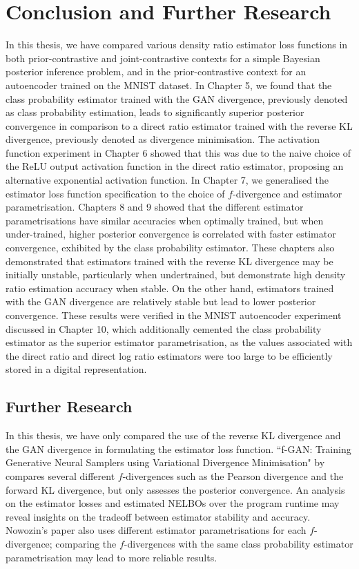\documentclass[honours,12pt]{unswthesis}
\numberwithin{equation}{section}
\theoremstyle{definition}
\begin{document}
\chapter{Conclusion and Further Research}
In this thesis, we have compared various density ratio estimator loss functions in both prior-contrastive and joint-contrastive contexts for a simple Bayesian posterior inference problem, and in the prior-contrastive context for an autoencoder trained on the MNIST dataset. In Chapter 5, we found that the class probability estimator trained with the GAN divergence, previously denoted as class probability estimation, leads to significantly superior posterior convergence in comparison to a direct ratio estimator trained with the reverse KL divergence, previously denoted as divergence minimisation. The activation function experiment in Chapter 6 showed that this was due to the naive choice of the ReLU output activation function in the direct ratio estimator, proposing an alternative exponential activation function. In Chapter 7, we generalised the estimator loss function specification to the choice of $f$-divergence and estimator parametrisation. Chapters 8 and 9 showed that the different estimator parametrisations have similar accuracies when optimally trained, but when under-trained, higher posterior convergence is correlated with faster estimator convergence, exhibited by the class probability estimator. These chapters also demonstrated that estimators trained with the reverse KL divergence may be initially unstable, particularly when undertrained, but demonstrate high density ratio estimation accuracy when stable. On the other hand, estimators trained with the GAN divergence are relatively stable but lead to lower posterior convergence. These results were verified in the MNIST autoencoder experiment discussed in Chapter 10, which additionally cemented the class probability estimator as the superior estimator parametrisation, as the values associated with the direct ratio and direct log ratio estimators were too large to be efficiently stored in a digital representation.
\section{Further Research}
In this thesis, we have only compared the use of the reverse KL divergence and the GAN divergence in formulating the estimator loss function. ``f-GAN: Training Generative Neural Samplers using Variational Divergence Minimisation" by \citet{nowozin} compares several different $f$-divergences such as the Pearson divergence and the forward KL divergence, but only assesses the posterior convergence. An analysis on the estimator losses and estimated NELBOs over the program runtime may reveal insights on the tradeoff between estimator stability and accuracy. Nowozin's paper also uses different estimator parametrisations for each $f$-divergence; comparing the $f$-divergences with the same class probability estimator parametrisation may lead to more reliable results.
\end{document}
